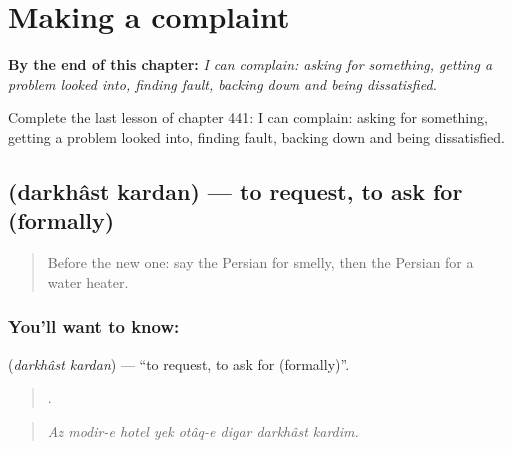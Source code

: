 
\chapter{Making a complaint}
\label{ch:fa-making-a-complaint}

\begin{chapteropening}
\textbf{By the end of this chapter:} \emph{I can complain: asking for something, getting a problem looked into, finding fault, backing down and being dissatisfied.}

Complete the last lesson of chapter 441: I can complain: asking for something, getting a problem looked into, finding fault, backing down and being dissatisfied.
\end{chapteropening}

\section[\texorpdfstring{\fa{درخواست} \fa{کردن} (darkhâst kardan)}{درخواست کردن (darkhâst kardan)}]{  (darkhâst kardan) — to request, to ask for (formally)}

\label{lesson:FA-C441-darkhast-kardan}



\begin{quote}
Before the new one: say the Persian for smelly, then the Persian for a water heater.
\end{quote}

\subsection*{You'll want to know:  }
\textbf{ } (\emph{darkhâst kardan}) — \textquotedblleft{}to request, to ask for (formally)\textquotedblright{}.

\begin{quote}
       .
\end{quote}

\begin{quote}
\emph{Az modir-e hotel yek otâq-e digar darkhâst kardim.}
\end{quote}

